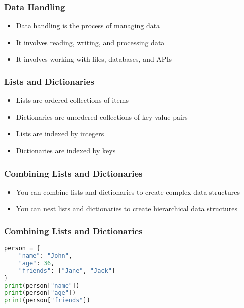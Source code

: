 \documentclass[serif, 9pt, aspectratio=32]{beamer}
\begin{document}
\begin{frame}
    \centering
    \frametitle{Data Handling}
    \begin{itemize}
        \setlength{\itemsep}{2em}
        \item Data handling is the process of managing data
        \item It involves reading, writing, and processing data
        \item It involves working with files, databases, and APIs
    \end{itemize}
\end{frame}

\begin{frame}
    \centering
    \frametitle{Lists and Dictionaries}
    \begin{itemize}
        \setlength{\itemsep}{2em}
        \item Lists are ordered collections of items
        \item Dictionaries are unordered collections of key-value pairs
        \item Lists are indexed by integers
        \item Dictionaries are indexed by keys
    \end{itemize}
\end{frame}

\begin{frame}
    \centering
    \frametitle{Combining Lists and Dictionaries}
    \begin{itemize}
        \setlength{\itemsep}{2em}
        \item You can combine lists and dictionaries to create complex data structures
        \item You can nest lists and dictionaries to create hierarchical data structures
    \end{itemize}
\end{frame}

\begin{frame}[fragile]
    \frametitle{Combining Lists and Dictionaries}
    \begin{lstlisting}[language=Python]
person = {
    "name": "John",
    "age": 36,
    "friends": ["Jane", "Jack"]
}
print(person["name"])
print(person["age"])
print(person["friends"])
    \end{lstlisting}
\end{frame}
\end{document}
